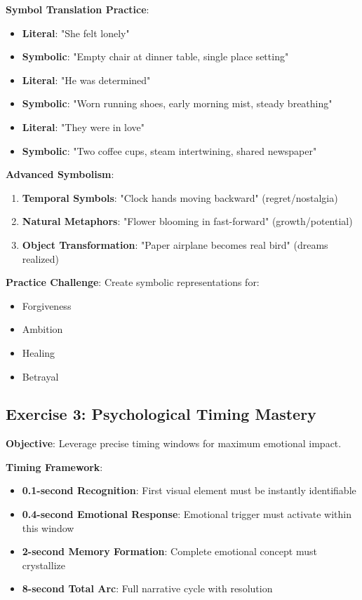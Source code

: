 \textbf{Symbol Translation Practice}:
\begin{itemize}
\item \textbf{Literal}: "She felt lonely" 
\item \textbf{Symbolic}: "Empty chair at dinner table, single place setting"
\item \textbf{Literal}: "He was determined"
\item \textbf{Symbolic}: "Worn running shoes, early morning mist, steady breathing"
\item \textbf{Literal}: "They were in love"
\item \textbf{Symbolic}: "Two coffee cups, steam intertwining, shared newspaper"
\end{itemize}

\textbf{Advanced Symbolism}:
\begin{enumerate}
\item \textbf{Temporal Symbols}: "Clock hands moving backward" (regret/nostalgia)
\item \textbf{Natural Metaphors}: "Flower blooming in fast-forward" (growth/potential)
\item \textbf{Object Transformation}: "Paper airplane becomes real bird" (dreams realized)
\end{enumerate}

\textbf{Practice Challenge}: Create symbolic representations for:
\begin{itemize}
\item Forgiveness
\item Ambition
\item Healing
\item Betrayal
\end{itemize}

\subsection*{Exercise 3: Psychological Timing Mastery}
\textbf{Objective}: Leverage precise timing windows for maximum emotional impact.

\textbf{Timing Framework}:
\begin{itemize}
\item \textbf{0.1-second Recognition}: First visual element must be instantly identifiable
\item \textbf{0.4-second Emotional Response}: Emotional trigger must activate within this window
\item \textbf{2-second Memory Formation}: Complete emotional concept must crystallize
\item \textbf{8-second Total Arc}: Full narrative cycle with resolution
\end{itemize}

